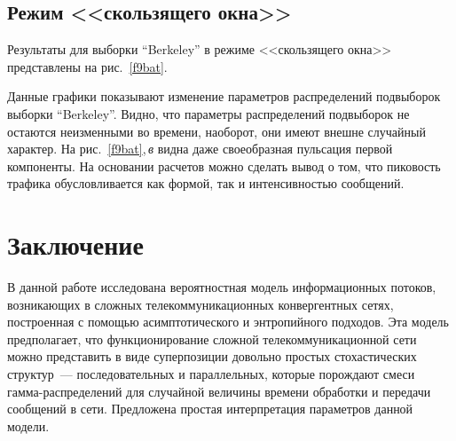 \begin{multicols}{2}
\subsection{Режим <<скользящего окна>>} %

Результаты для выборки
``Berkeley'' в режиме <<скользящего окна>>  представлены
на рис.~\ref{f9bat}.


Данные графики показывают изменение параметров распределений подвыборок выборки 
``Berkeley''. Видно, что параметры распределений подвыборок не остаются 
неизменными во времени, наоборот, они имеют внешне случайный характер. На 
рис.~\ref{f9bat},\,\textit{в} видна даже своеобразная пульсация первой 
компоненты.
%
На основании расчетов можно сделать вывод о том, что пиковость трафика
обусловливается как формой, так и интенсивностью сообщений.

\section{Заключение}

В данной работе исследована вероятностная модель  информационных потоков,
возникающих в сложных телекоммуникационных конвергентных сетях, построенная с
помощью асимптотического и энтропийного подходов. Эта модель предполагает, что
функционирование сложной телекоммуникационной сети можно представить в виде
суперпозиции довольно простых стохастических структур~--- последовательных и
параллельных, которые по\-рож\-да\-ют смеси гамма-распределений для случайной
величины времени обработки и передачи сообщений в сети. Предложена простая
интерпретация параметров данной модели.
\begin{figure*} %
\vspace*{1pt}
\begin{center}
\mbox{%
\epsfxsize=130mm %
 }
\end{center}
\vspace*{-13pt} 
\vspace*{12pt}
\begin{center}
\mbox{%
\epsfxsize=130mm %
 }
\end{center}
\vspace*{-13pt} 
\end{figure*}




\end{multicols}
